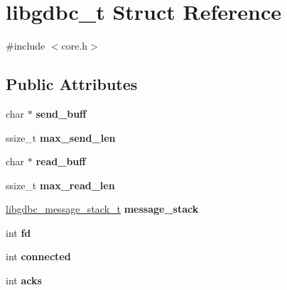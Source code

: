 \hypertarget{structlibgdbc__t}{\section{libgdbc\-\_\-t Struct Reference}
\label{structlibgdbc__t}
}


{\ttfamily \#include $<$core.\-h$>$}

\subsection*{Public Attributes}
\begin{DoxyCompactItemize}
\item 
\hypertarget{structlibgdbc__t_a03b64b8fc4eb9cef58d2cd9c980897bd}{char $\ast$ {\bfseries send\-\_\-buff}}\label{structlibgdbc__t_a03b64b8fc4eb9cef58d2cd9c980897bd}

\item 
\hypertarget{structlibgdbc__t_a085704b3ea2e84becfda2bc09d5c7f42}{ssize\-\_\-t {\bfseries max\-\_\-send\-\_\-len}}\label{structlibgdbc__t_a085704b3ea2e84becfda2bc09d5c7f42}

\item 
\hypertarget{structlibgdbc__t_a9b57686f6044141573da674614f522bd}{char $\ast$ {\bfseries read\-\_\-buff}}\label{structlibgdbc__t_a9b57686f6044141573da674614f522bd}

\item 
\hypertarget{structlibgdbc__t_a83785bf614b2f4151c0461a30c0d8671}{ssize\-\_\-t {\bfseries max\-\_\-read\-\_\-len}}\label{structlibgdbc__t_a83785bf614b2f4151c0461a30c0d8671}

\item 
\hypertarget{structlibgdbc__t_a1be16ae566e77635c6bb88955c5f4441}{\hyperlink{structlibgdbc__message__stack__t}{libgdbc\-\_\-message\-\_\-stack\-\_\-t} {\bfseries message\-\_\-stack}}\label{structlibgdbc__t_a1be16ae566e77635c6bb88955c5f4441}

\item 
\hypertarget{structlibgdbc__t_aa5f0d65cc4e6b2949cf2e5afeeb17446}{int {\bfseries fd}}\label{structlibgdbc__t_aa5f0d65cc4e6b2949cf2e5afeeb17446}

\item 
\hypertarget{structlibgdbc__t_a006cbf3913a295015d8c6e566f60b010}{int {\bfseries connected}}\label{structlibgdbc__t_a006cbf3913a295015d8c6e566f60b010}

\item 
\hypertarget{structlibgdbc__t_abab6215e06cc736e56cbebec37b73fdb}{int {\bfseries acks}}\label{structlibgdbc__t_abab6215e06cc736e56cbebec37b73fdb}


\end{DoxyCompactItemize}
